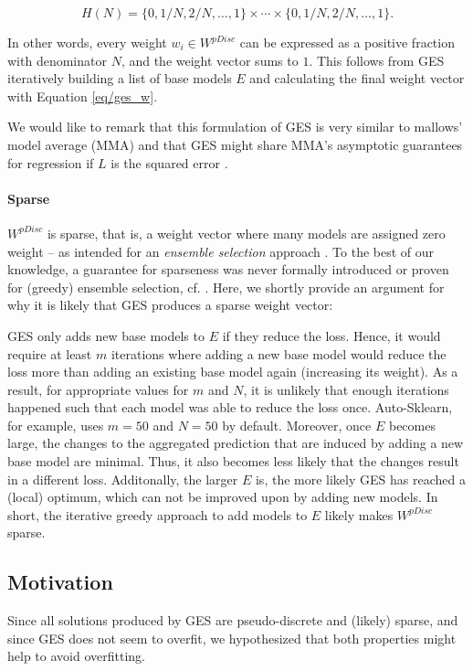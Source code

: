 \documentclass[11pt]{article}
\begin{document}
\begin{equation}
    H(N) = \{0, 1/N, 2/N, \dots , 1\} \times \cdots \times \{0, 1/N, 2/N, \dots, 1\}.
    \label{eq/h_cat}
\end{equation}

In other words, every weight $w_i \in W^{pDisc}$ can be expressed as a positive fraction with denominator $N$, and the weight vector sums to $1$. 
This follows from GES iteratively building a list of base models $E$ and calculating the final weight vector with Equation \ref{eq/ges_w}. 

We would like to remark that this formulation of GES is very similar to mallows' model average (MMA) \citep{ hansen2007least, hansen2008least, DBLP:journals/jmlr/LeC22} and that GES might share MMA's asymptotic guarantees for regression if $L$ is the squared error \citep{DBLP:journals/jmlr/LeC22}.  

\paragraph{Sparse}
$W^{pDisc}$ is sparse, that is, a weight vector where many models are assigned zero weight -- as intended for an \emph{ensemble selection} approach \citep{ens/es_primer}.
To the best of our knowledge, a guarantee for sparseness was never formally introduced or proven for (greedy) ensemble selection, cf. \citep{caruana2004, caruana2006, ens/es_primer}. 
Here, we shortly provide an argument for why it is likely that GES produces a sparse weight vector:

GES only adds new base models to $E$ if they reduce the loss. 
Hence, it would require at least $m$ iterations where adding a new base model would reduce the loss more than adding an existing base model again (increasing its weight).
As a result, for appropriate values for $m$ and $N$, it is unlikely that enough iterations happened such that each model was able to reduce the loss once.
Auto-Sklearn, for example, uses $m = 50$ and $N = 50$ by default. 
Moreover, once $E$ becomes large, the changes to the aggregated prediction that are induced by adding a new base model are minimal. 
Thus, it also becomes less likely that the changes result in a different loss.
Additonally, the larger $E$ is, the more likely GES has reached a (local) optimum, which can not be improved upon by adding new models. 
In short, the iterative greedy approach to add models to $E$ likely makes $W^{pDisc}$ sparse. 

\subsection{Motivation}
Since all solutions produced by GES are pseudo-discrete and (likely) sparse, and since GES does not seem to overfit, we hypothesized that both properties might help to avoid overfitting. 
\end{document}
